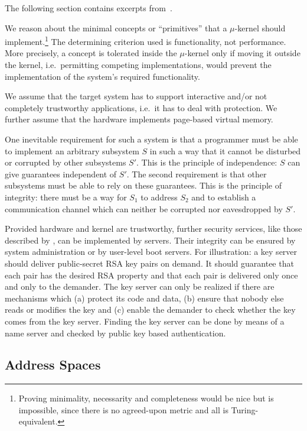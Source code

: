 \documentclass[a4paper,11pt,twoside,dvips]{book}
\newcommand{\micro}{$\mu$}
\begin{document}
The following section contains excerpts from~\cite{persistent,sosp,sosp2}. 
 
\vspace{10pt} 
 
\noindent 
We reason about the minimal concepts or ``primitives'' that
a \micro-kernel should implement.\footnote{ 
    Proving minimality, necessarity and completeness would be nice but
    is impossible, since there is no agreed-upon  metric and all is
    Turing-equivalent.} 
The determining criterion used is functionality,
not performance. More precisely, a concept is tolerated inside the
\micro-kernel only if moving it outside the kernel, i.e.\ permitting
competing implementations, would prevent the implementation of the system's
required functionality. 
 
We assume that the target system has to support interactive and/or not
completely trustworthy applications, i.e.\ it has to deal with protection. We
further assume that the hardware implements page-based virtual memory. 
 
 
One inevitable requirement for such a system is that a programmer must be
able to implement an arbitrary subsystem $S$ in such a way that it cannot be
disturbed or corrupted by other subsystems $S'$. This is the principle of
independence: $S$ can give guarantees independent of $S'$. The second
requirement is that other subsystems must be able to rely on these
guarantees. This is the principle of integrity: there must be a way for $S_1$
to address $S_2$ and to establish a communication channel which can neither
be corrupted nor eavesdropped by $S'$. 
 
Provided hardware and kernel are trustworthy, further
security services, like those described by \cite{gasser:secarch}, can be
implemented by servers. Their integrity can be ensured by system
administration or by user-level boot servers. 
For illustration: a key server should deliver public-secret RSA key pairs on
demand. It should guarantee that each pair has the desired RSA property and
that each pair is delivered only once and only to the demander. The key
server can only be realized if there are mechanisms which (a) protect its
code and data, (b) ensure that nobody else reads or modifies the
key and (c) enable the demander to check whether the key comes from the key
server. Finding the key server can be done by means of a name server and
checked by public key based authentication.
 
 
 
\subsection{Address Spaces}                           \label{addsp} 
 
\end{document}
